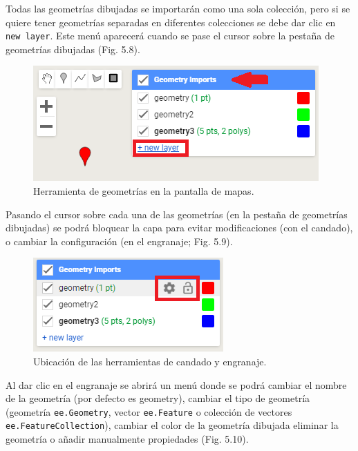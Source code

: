 \documentclass[
  12pt,
  letterpaper,
  twoside]{book}
\begin{document}
Todas las geometrías dibujadas se importarán como una sola colección, pero si se quiere tener geometrías separadas en diferentes colecciones se debe dar clic en \texttt{new\ layer}. Este menú aparecerá cuando se pase el cursor sobre la pestaña de geometrías dibujadas (Fig. 5.8).

\begin{figure}[btp]

{\centering \includegraphics[width=0.6\linewidth]{Img/nuevaGeo} 

}

\caption{Herramienta de geometrías en la pantalla de mapas.}\label{fig:unnamed-chunk-63}
\end{figure}

Pasando el cursor sobre cada una de las geometrías (en la pestaña de geometrías dibujadas) se podrá bloquear la capa para evitar modificaciones (con el candado), o cambiar la configuración (en el engranaje; Fig. 5.9).

\begin{figure}[btp]

{\centering \includegraphics[width=0.4\linewidth]{Img/dibujarGeo} 

}

\caption{Ubicación de las herramientas de candado y engranaje.}\label{fig:unnamed-chunk-64}
\end{figure}

Al dar clic en el engranaje se abrirá un menú donde se podrá cambiar el nombre de la geometría (por defecto es geometry), cambiar el tipo de geometría (geometría \texttt{ee.Geometry}, vector \texttt{ee.Feature} o colección de vectores \texttt{ee.FeatureCollection}), cambiar el color de la geometría dibujada eliminar la geometría o añadir manualmente propiedades (Fig. 5.10).
\end{document}
